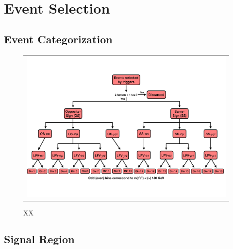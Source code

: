 \chapter{Event Selection}
\label{chap:Evt}



\section{Event Categorization}
\label{sec:Cat}

\begin{figure}[tbh!]
 \begin{center}
 \begin{tabular}{c}
 \includegraphics[width=\textwidth]{figures/Part4/Evt/SRFlowChart}
 \end{tabular}
 \caption{XX}
 \label{fig:EvtCat}
 \end{center}
 \end{figure}

\section{Signal Region}
\label{sec:SRInclusive}

